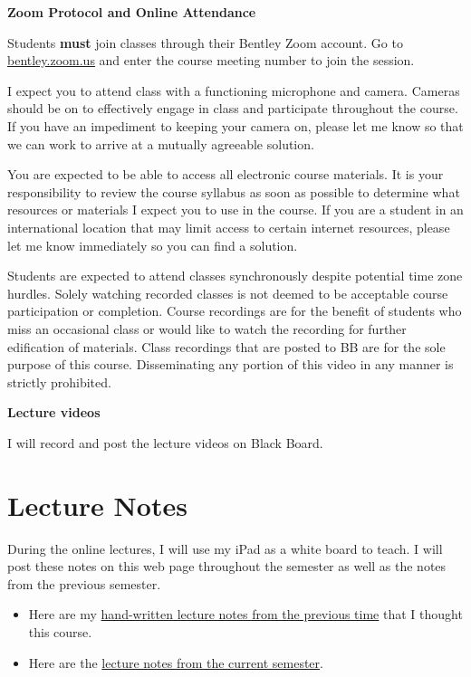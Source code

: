 \documentclass[
]{book}
\begin{document}
\textbf{Zoom Protocol and Online Attendance}

Students \textbf{must} join classes through their Bentley Zoom account. Go to \href{https://bentley.zoom.us}{bentley.zoom.us} and enter the course meeting number to join the session.

I expect you to attend class with a functioning microphone and camera. Cameras should be on to effectively engage in class and participate throughout the course. If you have an impediment to keeping your camera on, please let me know so that we can work to arrive at a mutually agreeable solution.

You are expected to be able to access all electronic course materials. It is your responsibility to review the course syllabus as soon as possible to determine what resources or materials I expect you to use in the course. If you are a student in an international location that may limit access to certain internet resources, please let me know immediately so you can find a solution.

Students are expected to attend classes synchronously despite potential time zone hurdles. Solely watching recorded classes is not deemed to be acceptable course participation or completion. Course recordings are for the benefit of students who miss an occasional class or would like to watch the recording for further edification of materials. Class recordings that are posted to BB are for the sole purpose of this course. Disseminating any portion of this video in any manner is strictly prohibited.

\textbf{Lecture videos}

I will record and post the lecture videos on Black Board.

\hypertarget{lecture-notes}{%
\section*{Lecture Notes}\label{lecture-notes}}

During the online lectures, I will use my iPad as a white board to teach. I will post these notes on this web page throughout the semester as well as the notes from the previous semester.

\begin{itemize}
\item
  Here are my \href{https://www.dropbox.com/s/e5c8qax19lkrrn3/EC\%20282\%20FALL\%202020.pdf?dl=0}{hand-written lecture notes from the previous time} that I thought this course.
\item
  Here are the \href{https://www.dropbox.com/s/oecrebseyksk570/EC\%20282\%20SPRING\%202021.pdf?dl=0}{lecture notes from the current semester}.
\end{itemize}
\end{document}
